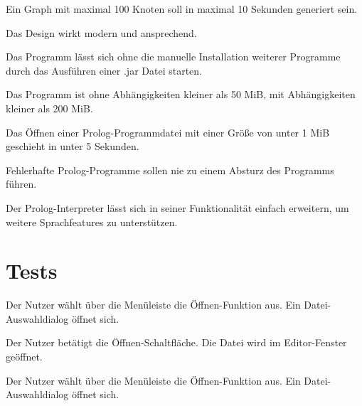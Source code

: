 \documentclass[parskip=full,11pt,twoside]{scrartcl}
\begin{document}

Ein Graph mit maximal 100 Knoten soll in maximal 10 Sekunden generiert sein.


Das Design wirkt modern und ansprechend.


Das Programm lässt sich ohne die manuelle Installation weiterer Programme durch das Ausführen einer .jar Datei starten.


Das Programm ist ohne Abhängigkeiten kleiner als 50 MiB, mit Abhängigkeiten kleiner als 200 MiB.


Das Öffnen einer Prolog-Programmdatei mit einer Größe von unter 1 MiB geschieht in unter 5 Sekunden.


Fehlerhafte Prolog-Programme sollen nie zu einem Absturz des Programms führen.


Der Prolog-Interpreter lässt sich in seiner Funktionalität einfach erweitern, um weitere Sprachfeatures zu unterstützen.

\section{Tests}


{Der Nutzer wählt über die Menüleiste die Öffnen-Funktion aus.}
{Ein Datei-Auswahldialog öffnet sich.}

{Der Nutzer betätigt die Öffnen-Schaltfläche.}
{Die Datei wird im Editor-Fenster geöffnet.}


{Der Nutzer wählt über die Menüleiste die Öffnen-Funktion aus.}
{Ein Datei-Auswahldialog öffnet sich.}
\end{document}
